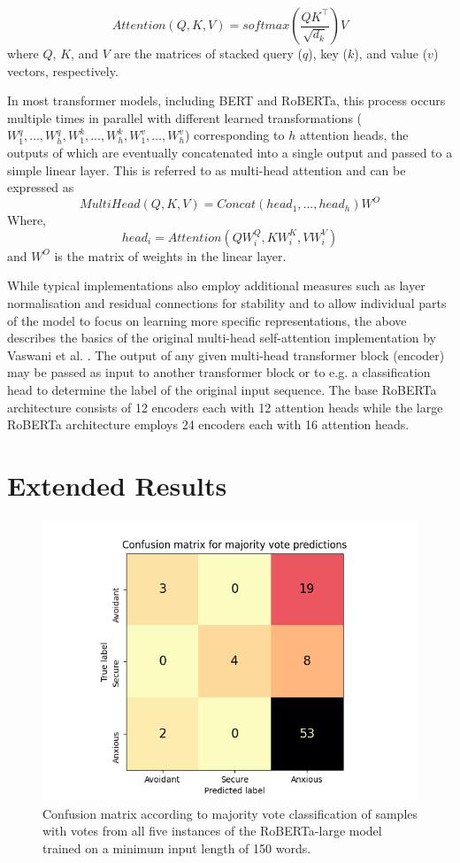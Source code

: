 \documentclass[12pt]{report}
\begin{document}
$$Attention(Q,K,V) = softmax\left(\frac{QK^\intercal}{\sqrt{d_k}}\right)V$$
where $Q$, $K$, and $V$ are the matrices of stacked query ($q$), key ($k$), and value ($v$) vectors, respectively.

In most transformer models, including BERT and RoBERTa, this process occurs multiple times in parallel with different learned transformations ($W_1^q, \ldots, W_h^q, W_1^k, \ldots, W_h^k, W_1^v, \ldots, W_h^v$) corresponding to $h$ attention heads, the outputs of which are eventually concatenated into a single output and passed to a simple linear layer.
This is referred to as multi-head attention and can be expressed as
$$MultiHead(Q, K, V) = Concat(head_1, ..., head_h)W^O$$
Where, $$head_i = Attention(Q W^Q_i, K W^K_i, V W^V_i)$$
and $W^O$ is the matrix of weights in the linear layer.

While typical implementations also employ additional measures such as layer normalisation and residual connections for stability and to allow individual parts of the model to focus on learning more specific representations, the above describes the basics of the original multi-head self-attention implementation by Vaswani et al. \citeyear{Vaswani2017}.
The output of any given multi-head transformer block (encoder) may be passed as input to another transformer block or to e.g. a classification head to determine the label of the original input sequence.
The base RoBERTa architecture consists of 12 encoders each with 12 attention heads while the large RoBERTa architecture employs 24 encoders each with 16 attention heads.

\chapter{Extended Results}
\label{App: confusion matrices}

\begin{figure}
    \includegraphics[width=\textwidth]{figures/roberta-large_150_combined_confusion_matrix.png}
    \caption{Confusion matrix according to majority vote classification of samples with votes from all five instances of the RoBERTa-large model trained on a minimum input length of 150 words.}
    \label{fig: combined confusion matrix}
\end{figure}
\end{document}
